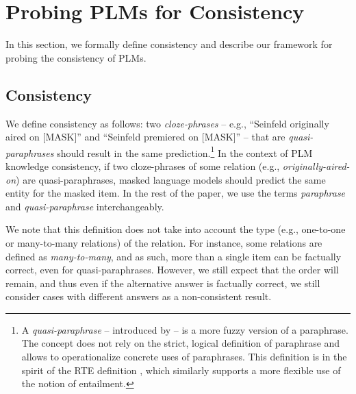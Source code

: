 \section{Probing PLMs for Consistency}
\label{sec:probe}

In this section, we formally define consistency and describe
our framework for probing the consistency of PLMs.

\subsection{Consistency}
We define consistency as follows: two \textit{cloze-phrases} --
e.g., ``Seinfeld originally aired on [MASK]'' and
``Seinfeld premiered on [MASK]'' -- that
are \textit{quasi-paraphrases} should result in the same
prediction.\footnote{A \textit{quasi-paraphrase} --
  introduced by \citet{what_is_paraphrase} -- is a more
  fuzzy version of a paraphrase. The concept does not rely
  on the strict, logical definition of paraphrase and
  allows to operationalize concrete uses of
  paraphrases. This definition is in the spirit of the RTE
  definition \cite{dagan-rte}, which similarly supports a
  more flexible use of the notion of entailment.}
In the context of PLM knowledge consistency, if two cloze-phrases 
of some relation (e.g., \textit{originally-aired-on}) are quasi-paraphrases, masked language models should predict the same entity for the masked item. 
In the rest of the paper, we use the terms \textit{paraphrase} and \textit{quasi-paraphrase} interchangeably.

 

We note that this definition does not take into account the type (e.g., one-to-one or many-to-many relations) of the relation. %
For instance, some relations are defined as \textit{many-to-many}, and as such, more than a single item can be factually correct, even for quasi-paraphrases. However, we still expect that the order will remain, and thus even if the alternative answer is factually correct, we still consider cases with different answers as a non-consistent result.

